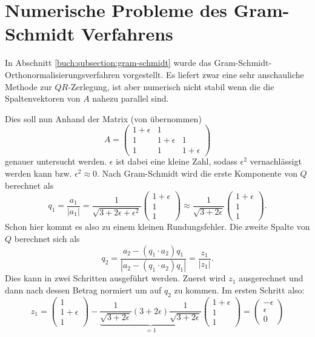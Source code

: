 %
%
%
\section{Numerische Probleme des Gram-Schmidt Verfahrens
\label{qr:section:problemstellung}}
In Abschnitt \ref{buch:subsection:gram-schmidt} wurde das Gram-Schmidt-Orthonormalisierungsverfahren vorgestellt.
Es liefert zwar eine sehr anschauliche Methode zur $QR$-Zerlegung, ist aber numerisch nicht stabil wenn die die Spaltenvektoren von $A$ nahezu parallel sind.

Dies soll nun Anhand der Matrix (von \cite{qr:tam} übernommen)
\begin{equation*}
A=\begin{pmatrix}
1+\epsilon&1&\\
1&1+\epsilon&1\\
1&1&1+\epsilon
\end{pmatrix}
\end{equation*}
genauer untersucht werden.
$\epsilon$ ist dabei eine \glqq kleine\grqq{} Zahl, sodass $\epsilon^2$ vernachlässigt werden kann bzw. $\epsilon^2\approx0$.
Nach Gram-Schmidt wird die erste Komponente von $Q$ berechnet als
\begin{equation*}
q_1=\frac{a_1}{|a_1|}=\frac{1}{\sqrt{3+2\epsilon+\epsilon^2}}
\begin{pmatrix}
1+\epsilon\\
1\\
1
\end{pmatrix}\approx\frac{1}{\sqrt{3+2\epsilon}}
\begin{pmatrix}
1+\epsilon\\
1\\
1
\end{pmatrix}.
\end{equation*}
Schon hier kommt es also zu einem kleinen Rundungsfehler.
Die zweite Spalte von $Q$ berechnet sich als
\begin{equation*}
q_2=\frac{a_2-(q_1\cdot a_2)q_1}{|a_2-(q_1\cdot a_2)q_1|}=\frac{z_1}{|z_1|}.
\end{equation*} 
Dies kann in zwei Schritten ausgeführt werden. Zuerst wird $z_1$ ausgerechnet und dann nach dessen Betrag normiert um auf $q_2$ zu kommen.
Im ersten Schritt also:
\begin{equation*}
z_1=
\begin{pmatrix}
1\\
1+\epsilon\\
1
\end{pmatrix}-\underbrace{\frac{1}{\sqrt{3+2\epsilon}}(3+2\epsilon)\frac{1}{\sqrt{3+2\epsilon}}}_{\displaystyle=1}
\begin{pmatrix}
1+\epsilon\\
1\\
1
\end{pmatrix}=
\begin{pmatrix}
-\epsilon\\
\epsilon\\
0
\end{pmatrix}
\end{equation*}

